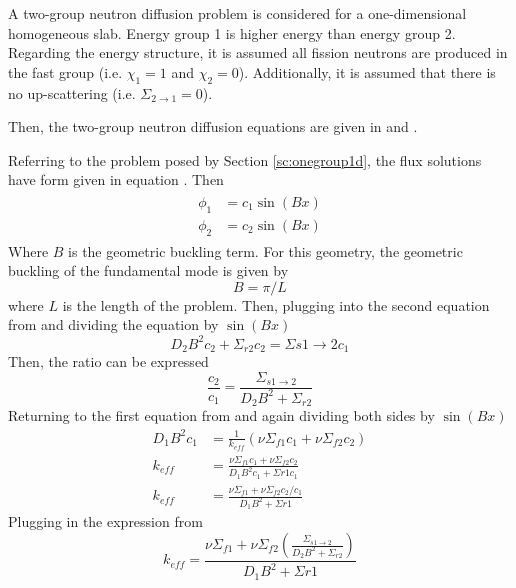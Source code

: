  A two-group neutron diffusion problem is considered for a one-dimensional
  homogeneous slab. Energy group 1 is higher energy than energy group 2. 
  Regarding the energy structure, it is assumed all fission neutrons are 
  produced in the fast group (i.e. $\chi_1=1$ and $\chi_2=0$). Additionally, 
  it is assumed that there is no up-scattering 
  (i.e. $\Sigma_{2\rightarrow1}=0$).
  
  Then, the two-group neutron diffusion equations are given in
   and .
  
  Referring to the problem posed by Section \ref{sc:onegroup1d}, the flux 
  solutions have form given in equation . Then
  \begin{align} \label{eq:twogroupflux}
  \begin{split}
    \phi_1 &= c_1 \sin(Bx) \\
    \phi_2 &= c_2 \sin(Bx)
  \end{split}
  \end{align}
  Where $B$ is the geometric buckling term. For this geometry, the geometric 
  buckling of the fundamental mode is given by 
  \begin{equation}
    B = \pi/L
  \end{equation}
  where $L$ is the length of the problem. Then, plugging 
   into the second equation from  
  and dividing the equation by $\sin(Bx)$
  \begin{equation}
    D_2 B^2 c_2 + \Sigma_{r2} c_2 = \Sigma{s1\rightarrow2} c_1
  \end{equation}
  Then, the ratio can be expressed
  \begin{equation} \label{eq:fluxratio}
    \frac{c_2}{c_1} = \frac{\Sigma_{s1\rightarrow2}}{D_2 B^2 + \Sigma_{r2}}
  \end{equation}
  Returning to the first equation from  and again dividing
  both sides by $\sin(Bx)$
  \begin{align}
    D_1 B^2 c_1 &= \frac{1}{k_{eff}} \left( \nu \Sigma_{f1} c_1 + 
      \nu \Sigma_{f2} c_2\right)\\
    k_{eff} &= \frac{\nu \Sigma_{f1} c_1 + \nu \Sigma_{f2} c_2}
      {D_1 B^2 c_1 + \Sigma{r1} c_1}\\
    k_{eff} &= \frac{\nu \Sigma_{f1} + \nu \Sigma_{f2} c_2/c_1}
      {D_1 B^2 + \Sigma{r1}}
  \end{align}
  Plugging in the expression from 
  \begin{equation}
    k_{eff} = \frac{\nu \Sigma_{f1} + \nu \Sigma_{f2} 
      \left(\frac{\Sigma_{s1\rightarrow2}}{D_2B^2+\Sigma_{r2}}\right)}
      {D_1 B^2 + \Sigma{r1}}
  \end{equation}
